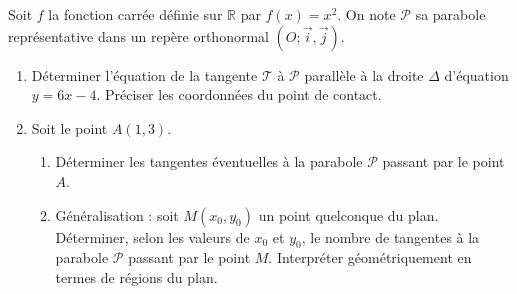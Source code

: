 \documentclass[11pt,a4paper]{article}
\newcommand{\R}{\mathbb{R}}
\begin{document}
Soit $f$ la fonction carrée définie sur $\R$ par $f(x) = x^2$. On note $\mathcal{P}$ sa parabole représentative dans un repère orthonormal $(O; \vec{i}, \vec{j})$.
\begin{enumerate}[label=\textbf{\arabic*.}]
    \item Déterminer l'équation de la tangente $\mathcal{T}$ à $\mathcal{P}$ parallèle à la droite $\Delta$ d'équation $y = 6x - 4$. Préciser les coordonnées du point de contact.
    \item Soit le point $A(1, 3)$.
    \begin{enumerate}[label=\alph*.]
        \item Déterminer les tangentes éventuelles à la parabole $\mathcal{P}$ passant par le point $A$.
        \item Généralisation : soit $M(x_0, y_0)$ un point quelconque du plan. Déterminer, selon les valeurs de $x_0$ et $y_0$, le nombre de tangentes à la parabole $\mathcal{P}$ passant par le point $M$. Interpréter géométriquement en termes de régions du plan.
    \end{enumerate}
\end{enumerate}
\end{document}
